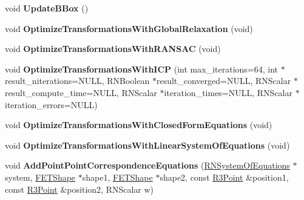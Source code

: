 \begin{DoxyCompactItemize}
\item 
void {\bfseries Update\+B\+Box} ()\hypertarget{struct_f_e_t_reconstruction_a09d157c474d6096644069d87a4d1a09a}{}\label{struct_f_e_t_reconstruction_a09d157c474d6096644069d87a4d1a09a}

\item 
void {\bfseries Optimize\+Transformations\+With\+Global\+Relaxation} (void)\hypertarget{struct_f_e_t_reconstruction_a77e175065d1b584ad9633212022eb431}{}\label{struct_f_e_t_reconstruction_a77e175065d1b584ad9633212022eb431}

\item 
void {\bfseries Optimize\+Transformations\+With\+R\+A\+N\+S\+AC} (void)\hypertarget{struct_f_e_t_reconstruction_a1b295790a8e273679981e6336f3f6e27}{}\label{struct_f_e_t_reconstruction_a1b295790a8e273679981e6336f3f6e27}

\item 
void {\bfseries Optimize\+Transformations\+With\+I\+CP} (int max\+\_\+iterations=64, int $\ast$result\+\_\+niterations=N\+U\+LL, R\+N\+Boolean $\ast$result\+\_\+converged=N\+U\+LL, R\+N\+Scalar $\ast$result\+\_\+compute\+\_\+time=N\+U\+LL, R\+N\+Scalar $\ast$iteration\+\_\+times=N\+U\+LL, R\+N\+Scalar $\ast$iteration\+\_\+errors=N\+U\+LL)\hypertarget{struct_f_e_t_reconstruction_ab241907058a09bf0b0106c8ea2af940b}{}\label{struct_f_e_t_reconstruction_ab241907058a09bf0b0106c8ea2af940b}

\item 
void {\bfseries Optimize\+Transformations\+With\+Closed\+Form\+Equations} (void)\hypertarget{struct_f_e_t_reconstruction_a58ed003be3b57577c97dbe112c724645}{}\label{struct_f_e_t_reconstruction_a58ed003be3b57577c97dbe112c724645}

\item 
void {\bfseries Optimize\+Transformations\+With\+Linear\+System\+Of\+Equations} (void)\hypertarget{struct_f_e_t_reconstruction_ad6512e04d2ae5a1305cf01a7e258b8fa}{}\label{struct_f_e_t_reconstruction_ad6512e04d2ae5a1305cf01a7e258b8fa}

\item 
void {\bfseries Add\+Point\+Point\+Correspondence\+Equations} (\hyperlink{class_r_n_system_of_equations}{R\+N\+System\+Of\+Equations} $\ast$system, \hyperlink{struct_f_e_t_shape}{F\+E\+T\+Shape} $\ast$shape1, \hyperlink{struct_f_e_t_shape}{F\+E\+T\+Shape} $\ast$shape2, const \hyperlink{class_r3_point}{R3\+Point} \&position1, const \hyperlink{class_r3_point}{R3\+Point} \&position2, R\+N\+Scalar w)\hypertarget{struct_f_e_t_reconstruction_a064ea1b8fcd38ba79ee7244687fb0ee2}{}\label{struct_f_e_t_reconstruction_a064ea1b8fcd38ba79ee7244687fb0ee2}


\end{DoxyCompactItemize}
